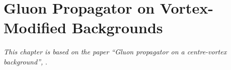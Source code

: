 
\chapter{Gluon Propagator on Vortex-Modified Backgrounds}\label{chapter:GluonPropagatorResults}
\ifpdf
    \graphicspath{{Chapter6/Figs/Raster/}{Chapter6/Figs/PDF/}{Chapter6/Figs/}}
\else
    \graphicspath{{Chapter6/Figs/Vector/}{Chapter6/Figs/}}
\fi
\textit{This chapter is based on the paper ``Gluon propagator on a centre-vortex background'', }\citet{Biddle:2018dtc}.

